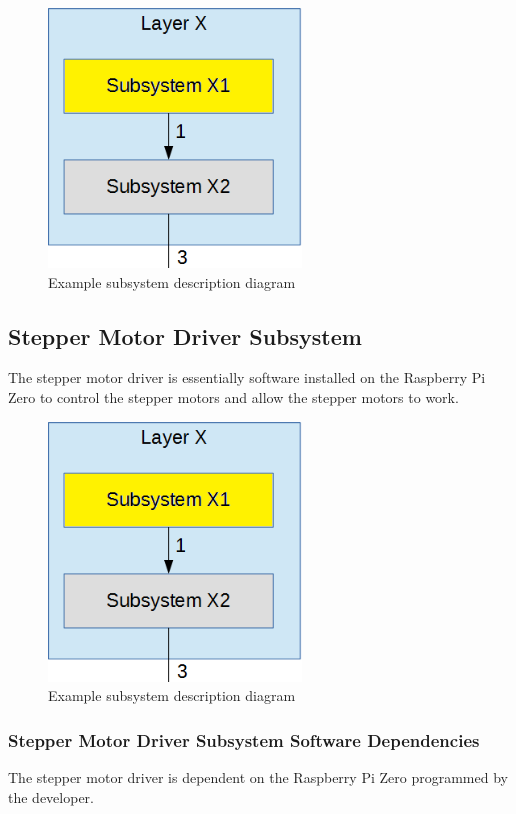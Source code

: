 \begin{figure}[h!]
	\centering
 	\includegraphics[width=0.60\textwidth]{images/subsystem}
 \caption{Example subsystem description diagram}
\end{figure}


\subsection{Stepper Motor Driver Subsystem}
The stepper motor driver is essentially software installed on the Raspberry Pi Zero to control the stepper motors and allow the stepper motors to work.

\begin{figure}[h!]
	\centering
 	\includegraphics[width=0.60\textwidth]{images/subsystem}
 \caption{Example subsystem description diagram}
\end{figure}


\subsubsection{Stepper Motor Driver Subsystem Software Dependencies}
The stepper motor driver is dependent on the Raspberry Pi Zero programmed by the developer.

